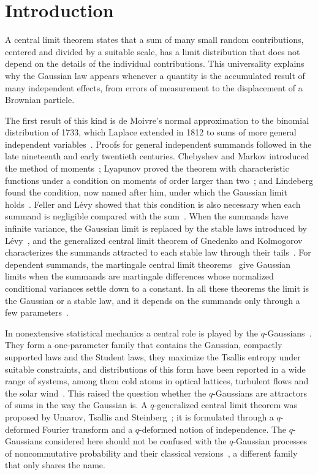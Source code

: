 \documentclass[aip,jmp,preprint,onecolumn,floatfix,superscriptaddress,nofootinbib,11pt]{revtex4-2}
\theoremstyle{plain}
\theoremstyle{remark}
\numberwithin{equation}{section}
\begin{document}
\maketitle

\section{Introduction}\label{sec:intro}

A central limit theorem states that a sum of many small random contributions, centered and divided by a suitable scale, has a limit distribution that does not depend on the details of the individual contributions. This universality explains why the Gaussian law appears whenever a quantity is the accumulated result of many independent effects, from errors of measurement to the displacement of a Brownian particle.

The first result of this kind is de Moivre's normal approximation to the binomial distribution of 1733, which Laplace extended in 1812 to sums of more general independent variables~\cite{Fischer}. Proofs for general independent summands followed in the late nineteenth and early twentieth centuries. Chebyshev and Markov introduced the method of moments~\cite{Fischer}; Lyapunov proved the theorem with characteristic functions under a condition on moments of order larger than two~\cite{Lyapunov}; and Lindeberg found the condition, now named after him, under which the Gaussian limit holds~\cite{Lindeberg}. Feller and L\'evy showed that this condition is also necessary when each summand is negligible compared with the sum~\cite{Feller1936,Levy1937}. When the summands have infinite variance, the Gaussian limit is replaced by the stable laws introduced by L\'evy~\cite{Levy1937}, and the generalized central limit theorem of Gnedenko and Kolmogorov characterizes the summands attracted to each stable law through their tails~\cite{GK}. For dependent summands, the martingale central limit theorems~\cite{Brown1971,McLeish1974} give Gaussian limits when the summands are martingale differences whose normalized conditional variances settle down to a constant. In all these theorems the limit is the Gaussian or a stable law, and it depends on the summands only through a few parameters~\cite{Feller}.

In nonextensive statistical mechanics a central role is played by the $q$-Gaussians~\cite{Tsallis1988,Tsallis}. They form a one-parameter family that contains the Gaussian, compactly supported laws and the Student laws, they maximize the Tsallis entropy under suitable constraints, and distributions of this form have been reported in a wide range of systems, among them cold atoms in optical lattices, turbulent flows and the solar wind~\cite{Tsallis}. This raised the question whether the $q$-Gaussians are attractors of sums in the way the Gaussian is. A $q$-generalized central limit theorem was proposed by Umarov, Tsallis and Steinberg~\cite{UTS2008}; it is formulated through a $q$-deformed Fourier transform and a $q$-deformed notion of independence. The $q$-Gaussians considered here should not be confused with the $q$-Gaussian processes of noncommutative probability and their classical versions~\cite{Bryc2001}, a different family that only shares the name.
\end{document}
